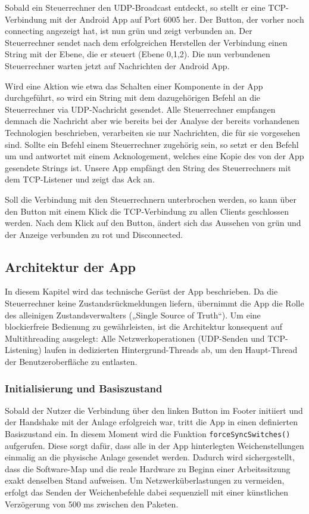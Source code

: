 \documentclass{article}
\begin{document}
Sobald ein Steuerrechner den UDP-Broadcast entdeckt, so stellt er eine TCP-Verbindung mit der Android App auf Port 6005 her.
Der Button, der vorher noch connecting angezeigt hat, ist nun grün und zeigt verbunden an.
Der Steuerrechner sendet nach dem erfolgreichen Herstellen der Verbindung einen String mit der Ebene, die er steuert (Ebene 0,1,2).
Die nun verbundenen Steuerrechner warten jetzt auf Nachrichten der Android App.

Wird eine Aktion wie etwa das Schalten einer Komponente in der App durchgeführt, so wird ein String mit dem dazugehörigen Befehl an die Steuerrechner via UDP-Nachricht gesendet.
Alle Steuerrechner empfangen demnach die Nachricht aber wie bereits bei der Analyse der bereits vorhandenen Technologien beschrieben, verarbeiten sie nur Nachrichten, die für sie vorgesehen sind.
Sollte ein Befehl einem Steuerrechner zugehörig sein, so setzt er den Befehl um und antwortet mit einem Acknologement, welches eine Kopie des von der App gesendete Strings ist.
Unsere App empfängt den String des Steuerrechners mit dem TCP-Listener und zeigt das Ack an.

Soll die Verbindung mit den Steuerrechnern unterbrochen werden, so kann über den Button mit einem Klick die TCP-Verbindung zu allen Clients geschlossen werden.
Nach dem Klick auf den Button, ändert sich das Aussehen von grün und der Anzeige verbunden zu rot und Disconnected.



\subsection{Architektur der App}
In diesem Kapitel wird das technische Gerüst der App beschrieben. Da die Steuerrechner keine Zustandsrückmeldungen liefern, übernimmt die App die Rolle des alleinigen Zustandsverwalters („Single Source of Truth“). Um eine blockierfreie Bedienung zu gewährleisten, ist die Architektur konsequent auf Multithreading ausgelegt: Alle Netzwerkoperationen (UDP-Senden und TCP-Listening) laufen in dedizierten Hintergrund-Threads ab, um den Haupt-Thread der Benutzeroberfläche zu entlasten.


\subsubsection{Initialisierung und Basiszustand}
Sobald der Nutzer die Verbindung über den linken Button im Footer initiiert und der Handshake mit der Anlage erfolgreich war, tritt die App in einen definierten Basiszustand ein. 
In diesem Moment wird die Funktion \texttt{forceSyncSwitches()} aufgerufen. Diese sorgt dafür, dass alle in der App hinterlegten Weichenstellungen einmalig an die physische Anlage gesendet werden. Dadurch wird sichergestellt, dass die Software-Map und die reale Hardware zu Beginn einer Arbeitssitzung exakt denselben Stand aufweisen. Um Netzwerküberlastungen zu vermeiden, erfolgt das Senden der Weichenbefehle dabei sequenziell mit einer künstlichen Verzögerung von 500 ms zwischen den Paketen.
\end{document}
